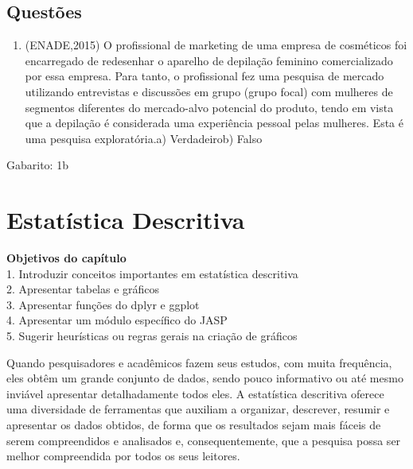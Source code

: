 \documentclass[
]{book}
\providecommand{\tightlist}{%
  \setlength{\itemsep}{0pt}\setlength{\parskip}{0pt}}
\begin{document}
\hypertarget{questuxf5es}{%
\section{Questões}\label{questuxf5es}}

\begin{question}

\begin{enumerate}
\def\labelenumi{\arabic{enumi}.}
\tightlist
\item
  (ENADE,2015) O profissional de marketing de uma empresa de cosméticos
  foi encarregado de redesenhar o aparelho de depilação feminino
  comercializado por essa empresa. Para tanto, o profissional fez uma
  pesquisa de mercado utilizando entrevistas e discussões em grupo
  (grupo focal) com mulheres de segmentos diferentes do mercado-alvo
  potencial do produto, tendo em vista que a depilação é considerada uma
  experiência pessoal pelas mulheres. Esta é uma pesquisa
  exploratória.a) Verdadeirob) Falso
\end{enumerate}

\end{question}

\begin{mirror}

Gabarito: 1b

\end{mirror}

\hypertarget{estatuxedstica-descritiva}{%
\chapter{Estatística Descritiva}\label{estatuxedstica-descritiva}}

\begin{objectives}
\textbf{Objetivos do capítulo}\\
1. Introduzir conceitos importantes em estatística descritiva\\
2. Apresentar tabelas e gráficos\\
3. Apresentar funções do dplyr e ggplot\\
4. Apresentar um módulo específico do JASP\\
5. Sugerir heurísticas ou regras gerais na criação de gráficos
\end{objectives}

Quando pesquisadores e acadêmicos fazem seus estudos, com muita
frequência, eles obtêm um grande conjunto de dados, sendo pouco
informativo ou até mesmo inviável apresentar detalhadamente todos eles.
A estatística descritiva oferece uma diversidade de ferramentas que
auxiliam a organizar, descrever, resumir e apresentar os dados obtidos,
de forma que os resultados sejam mais fáceis de serem compreendidos e
analisados e, consequentemente, que a pesquisa possa ser melhor
compreendida por todos os seus leitores.
\end{document}
